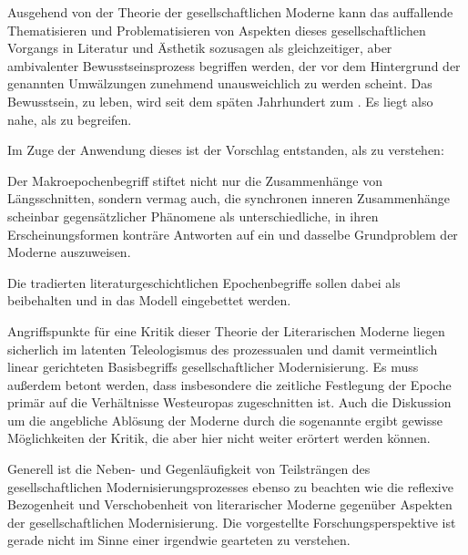 Ausgehend von der Theorie der gesellschaftlichen Moderne kann das auffallende
Thematisieren und Problematisieren von Aspekten dieses gesellschaftlichen
Vorgangs in Literatur und Ästhetik sozusagen als gleichzeitiger, aber
ambivalenter Bewusstseinsprozess begriffen werden, der vor dem Hintergrund der
genannten Umwälzungen zunehmend unausweichlich zu werden scheint. Das
Bewusstsein, \Cite{in grundsätzlich veränderter Zeit} zu leben, wird seit dem
späten  Jahrhundert zum \Cite{beherrschenden Gesichtspunkt
  ästhetischer Reflexion und Produktion}. Es
liegt also nahe, \Cite{ästhetische Moderne} als \Cite{ambivalente Reaktion auf
  gesellschaftliche Modernisierungsprozesse} zu
begreifen.

Im Zuge der Anwendung dieses \Cite{literaturhistorischen
  Paradigmas} ist der Vorschlag entstanden, \Cite{Literarische
  Moderne} als \Cite{Makroepoche} zu verstehen:

\begin{BlockQuote}
  Der Makroepochenbegriff stiftet nicht nur die Zusammenhänge von
  Längsschnitten, sondern vermag auch, die synchronen inneren Zusammenhänge
  scheinbar gegensätzlicher Phänomene als unterschiedliche, in ihren
  Erscheinungsformen konträre Antworten auf ein und dasselbe Grundproblem der
  Moderne auszuweisen.
\end{BlockQuote}
Die tradierten literaturgeschichtlichen Epochenbegriffe sollen dabei als
\Cite{Mikroepochen} beibehalten und in das Modell eingebettet
werden.

Angriffspunkte für eine Kritik dieser Theorie der Literarischen Moderne liegen
sicherlich im latenten Teleologismus des prozessualen und damit
vermeintlich linear gerichteten Basisbegriffs gesellschaftlicher
Modernisierung.  Es muss außerdem betont werden, dass insbesondere die
zeitliche Festlegung der Epoche primär auf die Verhältnisse Westeuropas
zugeschnitten ist. Auch die Diskussion um die angebliche Ablösung der Moderne
durch die sogenannte \Cite{Postmoderne} ergibt gewisse Möglichkeiten der
Kritik, die aber hier nicht weiter erörtert werden können.

Generell ist die Neben- und Gegenläufigkeit von Teilsträngen des
gesellschaftlichen Modernisierungsprozesses ebenso zu beachten wie die
reflexive Bezogenheit und Verschobenheit von literarischer Moderne gegenüber
Aspekten der gesellschaftlichen Modernisierung. Die vorgestellte
Forschungsperspektive ist gerade nicht im Sinne einer irgendwie gearteten
\Cite{Widerspiegelungstheorie} zu verstehen.

